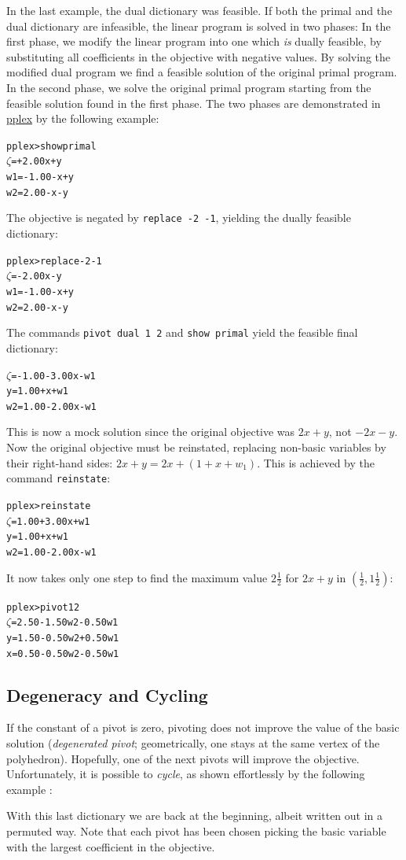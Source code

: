 \documentclass[ukenglish]{nik}
\begin{document}
In the last example, the dual dictionary was feasible. If both the primal and
the dual dictionary are infeasible, the linear program is solved in two phases: In the first phase,
we modify the linear program into one which \emph{is} dually feasible, by substituting all coefficients in the objective with negative values.
By solving the modified dual program we find a feasible solution of the original primal
program. In the second phase, we solve the original primal program starting from the 
feasible solution found in the first phase.
The two phases are demonstrated in \url{pplex} by the following example:
\begin{alltt}
pplex> show primal
 \(\zeta\) =        + 2.00x + y
w1 = - 1.00 -     x + y
w2 =   2.00 -     x - y
\end{alltt}
The objective is negated by \verb|replace -2 -1|,
yielding the dually feasible dictionary:
\begin{alltt}
pplex> replace -2 -1
 \(\zeta\)  =        - 2.00x - y
w1 = - 1.00 -     x + y
w2 =   2.00 -     x - y
\end{alltt}
The commands \verb|pivot dual 1 2| and \verb|show primal|
yield the feasible final dictionary:
\begin{alltt}
 \(\zeta\) = - 1.00 - 3.00x - w1
 y =   1.00 +     x + w1
w2 =   1.00 - 2.00x - w1
\end{alltt}
This is now a mock solution since the original objective was $2x+y$,
not $-2x-y$. Now the original objective must be reinstated,
replacing non-basic variables by their right-hand sides: $2x+y = 2x+(1+x+w_1)$.
This is achieved by the command \verb|reinstate|:
\begin{alltt}
pplex> reinstate
 \(\zeta\) = 1.00 + 3.00x + w1
 y = 1.00 +     x + w1
w2 = 1.00 - 2.00x - w1
\end{alltt}
It now takes only one step to find the maximum value $2\frac{1}{2}$ 
for $2x+y$ in $(\frac{1}{2},1\frac{1}{2})$:

\begin{alltt}
pplex> pivot 1 2
 \(\zeta\) = 2.50 - 1.50w2 - 0.50w1
 y = 1.50 - 0.50w2 + 0.50w1
 x = 0.50 - 0.50w2 - 0.50w1
\end{alltt}


\subsection{Degeneracy and Cycling}\label{sec:cycling}
If the constant of a pivot is zero, pivoting does not improve the value of the basic solution (\emph{degenerated pivot}; geometrically, one stays at the same vertex of the polyhedron). 
Hopefully, one of the next pivots will improve
the objective. Unfortunately, it is possible to \emph{cycle},
as shown effortlessly by the following example \cite{Chvatal,Vanderbei}:
\begin{alltt}

\end{alltt}
With this last dictionary we are back at the beginning, 
albeit written out in a permuted way. Note that each pivot has been
chosen picking the basic variable with the largest coefficient in the objective.
\end{document}
